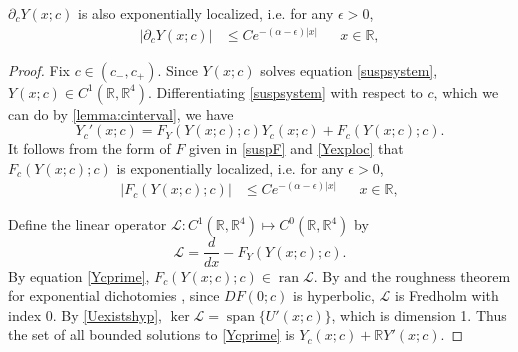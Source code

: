\documentclass[review,onefignum,onetabnum]{siamart171218}
\newcommand{\R}{\mathbb{R}}
\def\ker{\mathop\mathrm{ker}\nolimits}
\def\Ran{\mathop\mathrm{ran}\nolimits}
\def\Span{\mathop\mathrm{span}\nolimits}
\newcommand{\calL}{\mathcal{L}}
\begin{document}
\begin{lemma}$\partial_c Y(x; c)$ is also exponentially localized, i.e. for any $\epsilon > 0$, 
\begin{align}\label{Ycexploc}
|\partial_c Y(x; c)| &\leq C e^{-(\alpha - \epsilon)|x|} && x \in \R,
\end{align}
\begin{proof}
Fix $c \in (c_-, c_+)$. Since $Y(x; c)$ solves equation \cref{suspsystem}, $Y(x; c) \in C^1(\R, \R^4)$. Differentiating \cref{suspsystem} with respect to $c$, which we can do by \cref{lemma:cinterval}, we have
\begin{equation}\label{Ycprime}
Y_c'(x; c) = F_Y(Y(x;c); c) Y_c(x; c) + F_c(Y(x;c); c).
\end{equation}
It follows from the form of $F$ given in \cref{suspF} and \cref{Yexploc} that $F_c(Y(x;c); c)$ is exponentially localized, i.e. for any $\epsilon > 0$,
\begin{align}\label{Fcexploc}
|F_c(Y(x;c); c)| &\leq C e^{-(\alpha - \epsilon)|x|} && x \in \R,
\end{align}

Define the linear operator $\calL: C^1(\R, \R^4) \mapsto C^0(\R, \R^4)$ by
\begin{equation}\label{suspdefL}
\calL = \frac{d}{dx} - F_Y(Y(x;c); c).
\end{equation}
By equation \cref{Ycprime}, $F_c(Y(x;c); c) \in \Ran \calL$. By \cite[Lemma 4.2]{Palmer1984} and the roughness theorem for exponential dichotomies \cite{Coppel1978}, since $DF(0; c)$ is hyperbolic, $\calL$ is Fredholm with index 0. By \cref{Uexistshyp}, $\ker \calL = \Span\{U'(x; c)\}$, which is dimension 1. Thus the set of all bounded solutions to \cref{Ycprime} is $Y_c(x; c) + \R Y'(x; c)$.


\end{proof}
\end{lemma}
\end{document}
